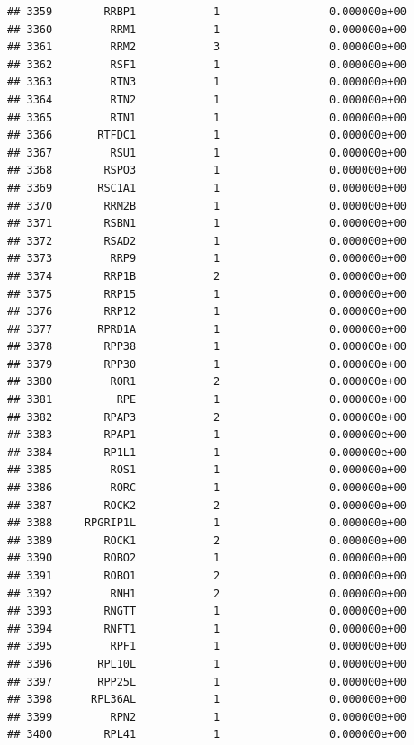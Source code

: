 \documentclass[
]{article}
\begin{document}
\begin{verbatim}
## 3359        RRBP1            1                 0.000000e+00
## 3360         RRM1            1                 0.000000e+00
## 3361         RRM2            3                 0.000000e+00
## 3362         RSF1            1                 0.000000e+00
## 3363         RTN3            1                 0.000000e+00
## 3364         RTN2            1                 0.000000e+00
## 3365         RTN1            1                 0.000000e+00
## 3366       RTFDC1            1                 0.000000e+00
## 3367         RSU1            1                 0.000000e+00
## 3368        RSPO3            1                 0.000000e+00
## 3369       RSC1A1            1                 0.000000e+00
## 3370        RRM2B            1                 0.000000e+00
## 3371        RSBN1            1                 0.000000e+00
## 3372        RSAD2            1                 0.000000e+00
## 3373         RRP9            1                 0.000000e+00
## 3374        RRP1B            2                 0.000000e+00
## 3375        RRP15            1                 0.000000e+00
## 3376        RRP12            1                 0.000000e+00
## 3377       RPRD1A            1                 0.000000e+00
## 3378        RPP38            1                 0.000000e+00
## 3379        RPP30            1                 0.000000e+00
## 3380         ROR1            2                 0.000000e+00
## 3381          RPE            1                 0.000000e+00
## 3382        RPAP3            2                 0.000000e+00
## 3383        RPAP1            1                 0.000000e+00
## 3384        RP1L1            1                 0.000000e+00
## 3385         ROS1            1                 0.000000e+00
## 3386         RORC            1                 0.000000e+00
## 3387        ROCK2            2                 0.000000e+00
## 3388     RPGRIP1L            1                 0.000000e+00
## 3389        ROCK1            2                 0.000000e+00
## 3390        ROBO2            1                 0.000000e+00
## 3391        ROBO1            2                 0.000000e+00
## 3392         RNH1            2                 0.000000e+00
## 3393        RNGTT            1                 0.000000e+00
## 3394        RNFT1            1                 0.000000e+00
## 3395         RPF1            1                 0.000000e+00
## 3396       RPL10L            1                 0.000000e+00
## 3397       RPP25L            1                 0.000000e+00
## 3398      RPL36AL            1                 0.000000e+00
## 3399         RPN2            1                 0.000000e+00
## 3400        RPL41            1                 0.000000e+00

\end{verbatim}
\end{document}
